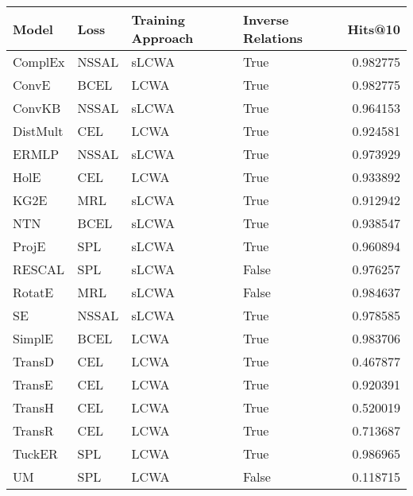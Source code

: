 \begin{tabular}{llllr}
\toprule
    Model &   Loss & Training Approach & Inverse Relations &   Hits@10 \\
\midrule
  ComplEx &  NSSAL &             sLCWA &              True &  0.982775 \\
    ConvE &   BCEL &              LCWA &              True &  0.982775 \\
   ConvKB &  NSSAL &             sLCWA &              True &  0.964153 \\
 DistMult &    CEL &              LCWA &              True &  0.924581 \\
    ERMLP &  NSSAL &             sLCWA &              True &  0.973929 \\
     HolE &    CEL &              LCWA &              True &  0.933892 \\
     KG2E &    MRL &             sLCWA &              True &  0.912942 \\
      NTN &   BCEL &             sLCWA &              True &  0.938547 \\
    ProjE &    SPL &             sLCWA &              True &  0.960894 \\
   RESCAL &    SPL &             sLCWA &             False &  0.976257 \\
   RotatE &    MRL &             sLCWA &             False &  0.984637 \\
       SE &  NSSAL &             sLCWA &              True &  0.978585 \\
   SimplE &   BCEL &              LCWA &              True &  0.983706 \\
   TransD &    CEL &              LCWA &              True &  0.467877 \\
   TransE &    CEL &              LCWA &              True &  0.920391 \\
   TransH &    CEL &              LCWA &              True &  0.520019 \\
   TransR &    CEL &              LCWA &              True &  0.713687 \\
   TuckER &    SPL &              LCWA &              True &  0.986965 \\
       UM &    SPL &              LCWA &             False &  0.118715 \\
\bottomrule
\end{tabular}

